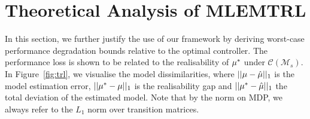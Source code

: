 \section{Theoretical Analysis of MLEMTRL}\label{sec:bounds}

In this section, we further justify the use of our framework by deriving worst-case performance degradation bounds relative to the optimal controller. The performance loss is shown to be related to the realisability of $\mu^{*}$ under $\mathcal{C}(\mathcal{M}_s)$. In Figure~\ref{fig:trl}, we visualise the model dissimilarities, where $||\mu-\hat{\mu}||_1$ is the model estimation error, $||\mu^{*}-\mu||_1$ is the realisability gap and $||\mu^{*}-\hat{\mu}||_1$ the total deviation of the estimated model. Note that by the norm on MDP, we always refer to the $L_1$ norm over transition matrices.


\iffalse
\subsection{Performance Gap in the Realisable Setting}

\begin{theorem}{Performance Gap of Realisable Models}
    \begin{equation}
        ||V_{{\mdp}_t}^{*}-\hat{V}_{{\mdp}_t, n}^{\pol^{*}(\hat{\Delta_{\mathrm{Realise}}})}|| \leq \, ???.
    \end{equation}
\end{theorem}
\fi


